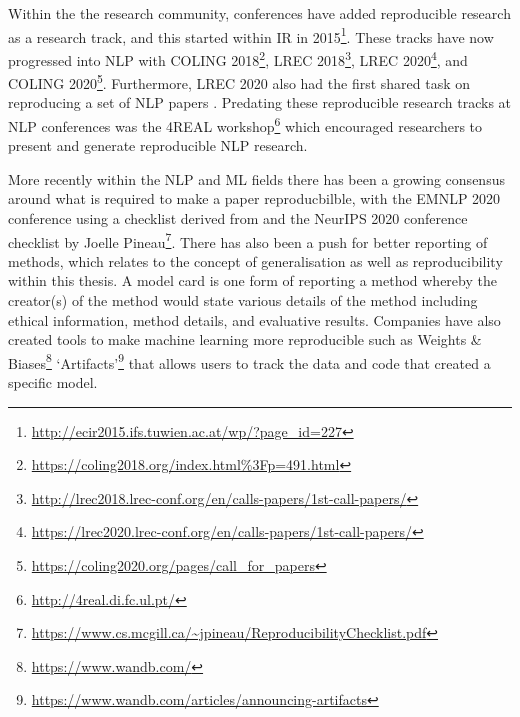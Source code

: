 Within the the research community, conferences have added reproducible research as a research track, and this started within IR in 2015\footnote{\url{http://ecir2015.ifs.tuwien.ac.at/wp/?page_id=227}}. These tracks have now progressed into NLP with COLING 2018\footnote{\url{https://coling2018.org/index.html\%3Fp=491.html}}, LREC 2018\footnote{\url{http://lrec2018.lrec-conf.org/en/calls-papers/1st-call-papers/}}, LREC 2020\footnote{\url{https://lrec2020.lrec-conf.org/en/calls-papers/1st-call-papers/}}, and COLING 2020\footnote{\url{https://coling2020.org/pages/call_for_papers}}. Furthermore, LREC 2020 also had the first shared task on reproducing a set of NLP papers \citep{branco-etal-2020-shared}. Predating these reproducible research tracks at NLP conferences was the 4REAL workshop\footnote{\url{http://4real.di.fc.ul.pt/}} which encouraged researchers to present and generate reproducible NLP research.


More recently within the NLP and ML fields there has been a growing consensus around what is required to make a paper reproducbilble, with the EMNLP 2020 conference using a checklist derived from \citet{dodge-etal-2019-show} and the NeurIPS 2020 conference checklist by Joelle Pineau\footnote{\url{https://www.cs.mcgill.ca/~jpineau/ReproducibilityChecklist.pdf}}. There has also been a push for better reporting of methods, which relates to the concept of generalisation as well as reproducibility within this thesis. A model card \citep{mitchell2019model} is one form of reporting a method whereby the creator(s) of the method would state various details of the method including ethical information, method details, and evaluative results. Companies have also created tools to make machine learning more reproducible such as Weights \& Biases\footnote{\url{https://www.wandb.com/}} `Artifacts'\footnote{\url{https://www.wandb.com/articles/announcing-artifacts}} that allows users to track the data and code that created a specific model.









